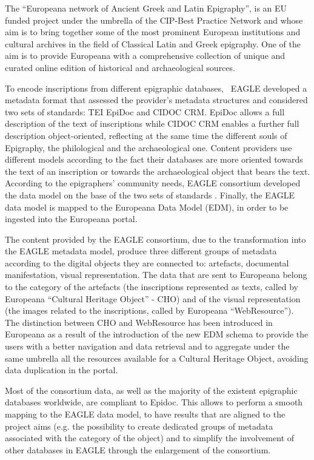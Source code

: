 \documentclass[amsthm,ebook]{saparticle}
\begin{document}
The ``Europeana network of Ancient Greek and Latin Epigraphy'', is an EU funded project under the umbrella of the CIP-Best
Practice Network and whose aim is to bring together some of the most prominent European institutions and cultural
archives in the field of Classical Latin and Greek epigraphy. One of the aim is to provide Europeana with a
comprehensive collection of unique and curated online edition of historical and archaeological sources.

To encode inscriptions from different epigraphic databases, \ EAGLE developed a metadata format that assessed the
provider’s metadata structures and considered two sets of standards: TEI EpiDoc and CIDOC CRM. EpiDoc allows a full
description of the text of inscriptions while CIDOC CRM enables a further full description object-oriented,
reflecting at the same time the different souls of Epigraphy, the philological and the archaeological one. Content
providers use different models according to the fact their databases are more oriented towards the text of an
inscription or towards the archaeological object that bears the text. According to the epigraphers’ community needs,
EAGLE consortium developed the data model on the base of the two sets of standards \citep{liuzzo_networking_2014}. Finally, the
EAGLE data model is mapped to the Europeana Data Model (EDM), in order to be ingested into the Europeana portal.

The content provided by the EAGLE consortium, due to the transformation into the EAGLE metadata model, produce three
different groups of metadata according to the digital objects they are connected to: artefacts, documental
manifestation, visual representation. The data that are sent to Europeana belong to the category of the artefacts (the
inscriptions represented as texts, called by Europeana ``Cultural Heritage Object'' - CHO) and of the visual
representation (the images related to the inscriptions, called by Europeana ``WebResource''). The distinction between CHO
and WebResource has been introduced in Europeana as a result of the introduction of the new EDM schema to provide the
users with a better navigation and data retrieval and to aggregate under the same umbrella all the resources available
for a Cultural Heritage Object, avoiding data duplication in the portal.

Most of the consortium data, as well as the majority of the existent epigraphic databases worldwide, are compliant to
Epidoc. This allows to perform a smooth mapping to the EAGLE data model, to have results that are aligned to the
project aims (e.g. the possibility to create dedicated groups of metadata associated with the category of the object)
and to simplify the involvement of other databases in EAGLE through the enlargement of the consortium.
\end{document}
